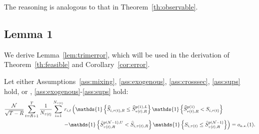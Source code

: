 The reasoning is analogous to that in Theorem~\ref{th:observable}.



\subsection{Lemma 1}

We derive Lemma~\ref{lem:trimerror}, which will be used in the derivation of Theorem~\ref{th:feasible} and Corollary~\ref{cor:error}.

\begin{lemma}
\label{lem:trimerror} 
Let either Assumptions~\ref{ass:mixing}, \ref{ass:exogenous}, \ref{ass:crosssec}, \ref{ass:sups} hold, or , \ref{ass:exogenous}-\ref{ass:sups} hold:
\begin{align*}
&\frac{\mathcal{N}}{\sqrt{T-R}}\sum_{t=R+1}^{T}\frac{1}{N_{\tau(t)}}\sum_{i=1}^{N_{\tau(t) }} r_{i,t}\left( \mathds{1} \left\{ \widehat{S}_{i,\tau(t),R}\leq \widehat{S}_{\tau(t),R}^{p(1),L}\right\} \mathds{1} \left\{ \widehat{S}_{\tau(t),R}^{p(1)} < S_{i,\tau(t) } \right\} \right. \\
&\hspace{3.9cm} \left. - \mathds{1} \left\{ \widehat{S}_{\tau(t),R}^{p(\mathcal{N}-1),U} < \widehat{S}_{i,\tau(t),R} \right\} \mathds{1} \left\{ S_{i,\tau(t) } \leq \widehat{S}_{\tau(t),R}^{p(\mathcal{N}-1)}\right\} \right) = o_{a.s.}(1).
\end{align*}
\end{lemma}



